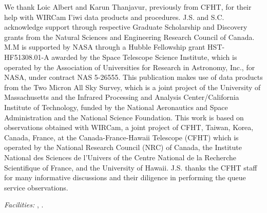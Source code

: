 \documentclass[iop]{emulateapj}
\begin{document}
\bigskip We thank Loic Albert and Karun Thanjavur, previously from CFHT, for their help with WIRCam I'iwi data products and procedures.
J.S. and S.C. acknowledge support through respective Graduate Scholarship and Discovery grants from the Natural Sciences and Engineering Research Council of Canada.
M.M is supported by NASA through a Hubble Fellowship grant HST-HF51308.01-A awarded by the Space Telescope Science Institute, which is operated by the Association of Universities for Research in Astronomy, Inc., for NASA, under contract NAS 5-26555.
This publication makes use of data products from the Two Micron All Sky Survey, which is a joint project of the University of Massachusetts and the Infrared Processing and Analysis Center/California Institute of Technology, funded by the National Aeronautics and Space Administration and the National Science Foundation.
This work is based on observations obtained with WIRCam, a joint project of CFHT, Taiwan, Korea, Canada, France, at the Canada-France-Hawaii Telescope (CFHT) which is operated by the National Research Council (NRC) of Canada, the Institute National des Sciences de l'Univers of the Centre National de la Recherche Scientifique of France, and the University of Hawaii. J.S. thanks the CFHT staff for many informative discussions and their diligence in performing the queue service observations.

{\it Facilities:} , .


\end{document}
